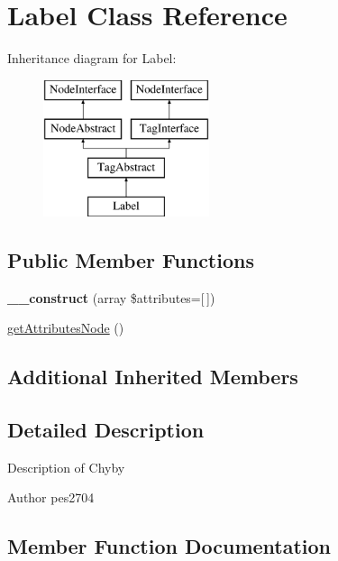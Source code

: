 \hypertarget{class_pes_1_1_dom_1_1_node_1_1_tag_1_1_label}{}\section{Label Class Reference}
\label{class_pes_1_1_dom_1_1_node_1_1_tag_1_1_label}
Inheritance diagram for Label\+:\begin{figure}[H]
\begin{center}
\leavevmode
\includegraphics[height=4.000000cm]{class_pes_1_1_dom_1_1_node_1_1_tag_1_1_label}
\end{center}
\end{figure}
\subsection*{Public Member Functions}
\begin{DoxyCompactItemize}
\item 
\mbox{\label{class_pes_1_1_dom_1_1_node_1_1_tag_1_1_label_afe55bc1439758d475e70446a774807d9}} 
{\bfseries \+\_\+\+\_\+construct} (array \$attributes=\mbox{[}$\,$\mbox{]})
\item 
\mbox{\hyperlink{class_pes_1_1_dom_1_1_node_1_1_tag_1_1_label_a4722e7722b245351681b05d35f6694f3}{get\+Attributes\+Node}} ()
\end{DoxyCompactItemize}
\subsection*{Additional Inherited Members}


\subsection{Detailed Description}
Description of Chyby

\begin{DoxyAuthor}{Author}
pes2704 
\end{DoxyAuthor}


\subsection{Member Function Documentation}
\mbox{\label{class_pes_1_1_dom_1_1_node_1_1_tag_1_1_label_a4722e7722b245351681b05d35f6694f3}} 
